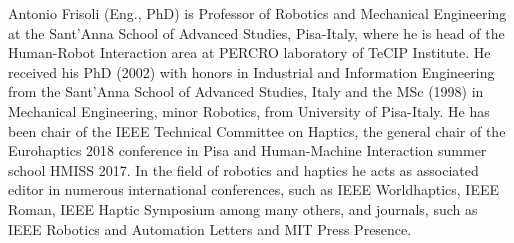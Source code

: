 \documentclass[journal]{IEEEtran}
\begin{document}
\begin{IEEEbiography}{Antonio Frisoli} (Eng., PhD) is Professor of Robotics and Mechanical Engineering at the Sant'Anna School of Advanced Studies, Pisa-Italy, where he is head of the Human-Robot Interaction area at PERCRO laboratory of TeCIP Institute. He received his PhD (2002) with honors in Industrial and Information Engineering from the Sant'Anna School of Advanced Studies, Italy and the MSc (1998) in Mechanical Engineering, minor Robotics, from University of Pisa-Italy.  He has been chair of the IEEE Technical Committee on Haptics, the general chair of the Eurohaptics 2018 conference in Pisa and Human-Machine Interaction summer school HMISS 2017. In the field of robotics and haptics he acts as associated editor in numerous international conferences, such as IEEE Worldhaptics, IEEE Roman, IEEE Haptic Symposium among many others, and journals, such as IEEE Robotics and Automation Letters and MIT Press Presence.


\end{IEEEbiography}






\end{document}
